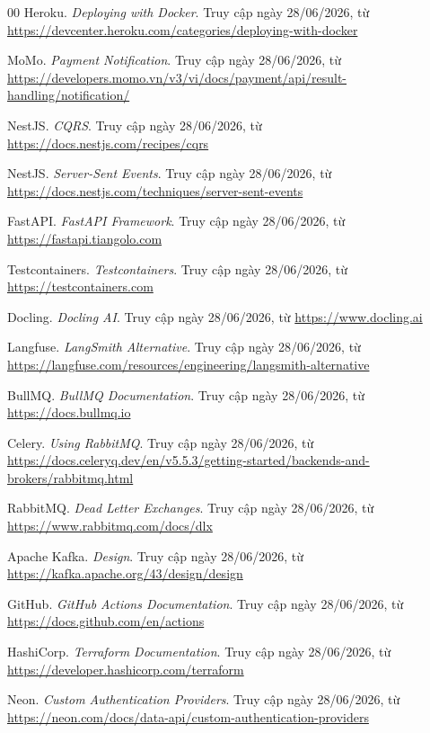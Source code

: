 \begin{thebibliography}{00}
Heroku. \textit{Deploying with Docker}. Truy cập ngày 28/06/2026, từ \url{https://devcenter.heroku.com/categories/deploying-with-docker}

MoMo. \textit{Payment Notification}. Truy cập ngày 28/06/2026, từ \url{https://developers.momo.vn/v3/vi/docs/payment/api/result-handling/notification/}

NestJS. \textit{CQRS}. Truy cập ngày 28/06/2026, từ \url{https://docs.nestjs.com/recipes/cqrs}

NestJS. \textit{Server-Sent Events}. Truy cập ngày 28/06/2026, từ \url{https://docs.nestjs.com/techniques/server-sent-events}

FastAPI. \textit{FastAPI Framework}. Truy cập ngày 28/06/2026, từ \url{https://fastapi.tiangolo.com}

Testcontainers. \textit{Testcontainers}. Truy cập ngày 28/06/2026, từ \url{https://testcontainers.com}

Docling. \textit{Docling AI}. Truy cập ngày 28/06/2026, từ \url{https://www.docling.ai}

Langfuse. \textit{LangSmith Alternative}. Truy cập ngày 28/06/2026, từ \url{https://langfuse.com/resources/engineering/langsmith-alternative}

BullMQ. \textit{BullMQ Documentation}. Truy cập ngày 28/06/2026, từ \url{https://docs.bullmq.io}

Celery. \textit{Using RabbitMQ}. Truy cập ngày 28/06/2026, từ \url{https://docs.celeryq.dev/en/v5.5.3/getting-started/backends-and-brokers/rabbitmq.html}

RabbitMQ. \textit{Dead Letter Exchanges}. Truy cập ngày 28/06/2026, từ \url{https://www.rabbitmq.com/docs/dlx}

Apache Kafka. \textit{Design}. Truy cập ngày 28/06/2026, từ \url{https://kafka.apache.org/43/design/design}

GitHub. \textit{GitHub Actions Documentation}. Truy cập ngày 28/06/2026, từ \url{https://docs.github.com/en/actions}

HashiCorp. \textit{Terraform Documentation}. Truy cập ngày 28/06/2026, từ \url{https://developer.hashicorp.com/terraform}

Neon. \textit{Custom Authentication Providers}. Truy cập ngày 28/06/2026, từ \url{https://neon.com/docs/data-api/custom-authentication-providers}


\end{thebibliography}
